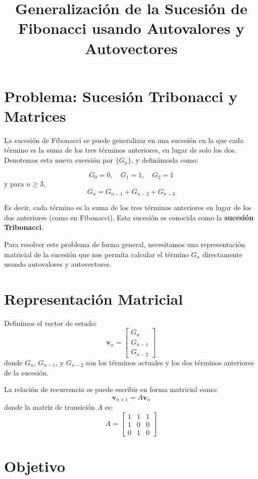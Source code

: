 \documentclass{article}
\begin{document}
\title{Generalización de la Sucesión de Fibonacci usando Autovalores y Autovectores}
\author{}
\date{}
\maketitle

\section*{Problema: Sucesión Tribonacci y Matrices}

La sucesión de Fibonacci se puede generalizar en una sucesión en la que cada término es la suma de los tres términos anteriores, en lugar de solo los dos. Denotemos esta nueva sucesión por \(\{G_n\}\), y definámosla como:

\[
G_0 = 0, \quad G_1 = 1, \quad G_2 = 1
\]
y para \(n \geq 3\),
\[
G_n = G_{n-1} + G_{n-2} + G_{n-3}
\]

Es decir, cada término es la suma de los tres términos anteriores en lugar de los dos anteriores (como en Fibonacci). Esta sucesión es conocida como la \textbf{sucesión Tribonacci}.

Para resolver este problema de forma general, necesitamos una representación matricial de la sucesión que nos permita calcular el término \(G_n\) directamente usando autovalores y autovectores.

\section*{Representación Matricial}

Definimos el vector de estado:
\[
\mathbf{v}_n = \begin{bmatrix} G_n \\ G_{n-1} \\ G_{n-2} \end{bmatrix}
\]
donde \(G_n\), \(G_{n-1}\), y \(G_{n-2}\) son los términos actuales y los dos términos anteriores de la sucesión.

La relación de recurrencia se puede escribir en forma matricial como:
\[
\mathbf{v}_{n+1} = A \mathbf{v}_n
\]
donde la matriz de transición \( A \) es:
\[
A = \begin{bmatrix} 1 & 1 & 1 \\ 1 & 0 & 0 \\ 0 & 1 & 0 \end{bmatrix}
\]

\section*{Objetivo}
\end{document}
